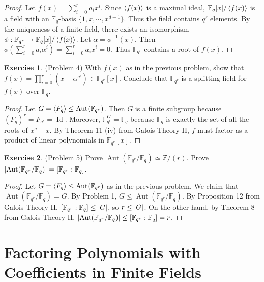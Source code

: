 \documentclass[12pt, psamsfonts]{amsart}
\theoremstyle{definition}
\newtheorem*{exer}{Exercise}
\theoremstyle{remark}
\DeclareMathOperator{\Id}{Id}
\DeclareMathOperator{\Aut}{Aut}
\numberwithin{equation}{section}
\begin{document}
\begin{proof}
  Let $f(x) = \sum_{i=0}^{r} a_ix^i$.
  Since $\ev{f(x)}$ is a maximal ideal, $\mathbb{F}_q[x]/\ev{f(x)}$ is a field with an $\mathbb{F}_q$-basis $\{ 1, x, \cdots, x^{d - 1} \}$.
  Thus the field contains $q^r$ elements.
  By the uniqueness of a finite field, there exists an isomorphism $\phi: \mathbb{F}_{q^r} \rightarrow \mathbb{F}_q[x]/\ev{f(x)}$.
  Let $\alpha = \phi^{-1}(x)$.
  Then $\phi(\sum_{i=0}^{r} a_i\alpha^i) = \sum_{i=0}^{r}a_ix^i = 0$.
  Thus $\mathbb{F}_{q^r}$ contains a root of $f(x)$.
\end{proof}

\begin{exer}{(Problem 4)}
  With $f(x)$ as in the previous problem, show that $f(x) = \prod_{i=0}^{r-1} (x - \alpha^{q^i}) \in \mathbb{F}_{q^r}[x]$.
  Conclude that $\mathbb{F}_{q^r}$ is a splitting field for $f(x)$ over $\mathbb{F}_q$.
\end{exer}

\begin{proof}
  Let $G = \ev{ F_q } \leq \Aut(\mathbb{F}_{q^r})$.
  Then $G$ is a finite subgroup because $(F_q)^r = F_{q^r} = \Id$.
  Moreover, $\mathbb{F}_{q^r}^G = \mathbb{F}_q$ because $\mathbb{F}_q$ is exactly the set of all the roots of $x^q - x$.
  By Theorem 11 (iv) from Galois Theory II, $f$ must factor as a product of linear polynomials in $\mathbb{F}_{q^r}[x]$.
\end{proof}

\begin{exer}{(Problem 5)}
  Prove $\Aut(\mathbb{F}_{q^r}/\mathbb{F}_q) \simeq \mathbb{Z}/(r)$.
  Prove $\abs{\Aut(\mathbb{F}_{q^r}/\mathbb{F}_q)} = [\mathbb{F}_{q^r}:\mathbb{F}_q]$.
\end{exer}

\begin{proof}
  Let $G = \ev{ F_q } \leq \Aut(\mathbb{F}_{q^r})$ as in the previous problem.
  We claim that $\Aut(\mathbb{F}_{q^r}/\mathbb{F}_q) = G$.
  By Problem 1, $G \leq \Aut(\mathbb{F}_{q^r}/\mathbb{F}_q)$.
  By Proposition 12 from Galois Theory II, $[\mathbb{F}_{q^r}:\mathbb{F}_q] \leq \abs{G}$, so $r \leq \abs{G}$.
  On the other hand, by Theorem 8 from Galois Theory II, $\abs{\Aut(\mathbb{F}_{q^r}/\mathbb{F}_q)} \leq [\mathbb{F}_{q^r}:\mathbb{F}_q] = r$.
\end{proof}

\section{Factoring Polynomials with Coefficients in Finite Fields}
\end{document}
